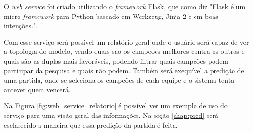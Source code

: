 O \textit{web service} foi criado utilizando o \textit{framework} Flask, que como \citet[tradução do autor]{flask} diz "Flask é um micro \textit{framework} para Python baseado em Werkzeug, Jinja 2 e em boas intenções.".

Com esse serviço será possível um relatório geral onde o usuário será capaz de ver a topologia do modelo, vendo quais são os campeões melhores contra os outros e quais são as duplas mais favoráveis, podendo filtrar quais campeões podem participar da pesquisa e quais não podem. 
Também será exequível a predição de uma partida, onde se seleciona os campeões de cada equipe e o sistema tenta antever quem vencerá.

Na Figura \ref{fig:web_service_relatorio} é possível ver um exemplo de uso do serviço para uma visão geral das informações. Na seção \ref{chap:pred} será esclarecido a maneira que essa predição da partida é feita.




